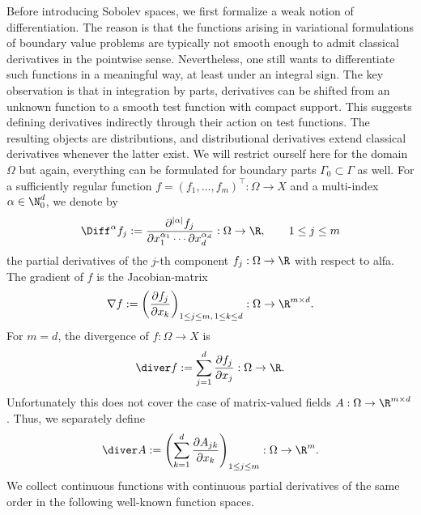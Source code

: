 Before introducing Sobolev spaces, we first formalize a weak notion of differentiation. The reason is that the functions arising in variational formulations of boundary value problems are typically not smooth enough to admit classical derivatives in the pointwise sense. Nevertheless, one still wants to differentiate such functions in a meaningful way, at least under an integral sign. The key observation is that in integration by parts, derivatives can be shifted from an unknown function to a smooth test function with compact support. This suggests defining derivatives indirectly through their action on test functions. The resulting objects are distributions, and distributional derivatives extend classical derivatives whenever the latter exist. We will restrict ourself here for the domain $\Omega$ but again, everything can be formulated for boundary parts $\Gamma_0\subset\Gamma$ as well. For a sufficiently regular function $f=(f_1,\ldots, f_m)^\top:\Omega\to X$ and a multi-index $\alpha\in\N^d_0$, we denote by
\begin{equation*}
	\Diff^\alpha f_j := \frac{\partial^{|\alpha|}f_j}{\partial x_1^{\alpha_1}\cdots\partial x_d^{\alpha_d}}:\Omega\to\R,\qquad 1\le j\le m
\end{equation*}
the partial derivatives of the $j$-th component $f_j:\Omega\to \R$ with respect to alfa. The gradient of $f$ is the Jacobian-matrix
\begin{equation*}
	\nabla f := \left(\frac{\partial f_j}{\partial x_k}\right)_{1\le j\le m,\, 1\le k\le d}:\Omega\to\R^{m\times d}.
\end{equation*}
For $m = d$, the divergence of $f:\Omega\to X$ is
\begin{equation*}
	\diver f:= \sum_{j = 1}^d\frac{\partial f_j}{\partial x_j}:\Omega \to \R.
\end{equation*}
Unfortunately this does not cover the case of matrix-valued fields $A:\Omega\to \R^{m\times d}$. Thus, we separately define
\begin{equation*}
	\diver A := \left(\sum_{k=1}^d \frac{\partial A_{jk}}{\partial x_k}\right)_{1\le j\le m}
	:\Omega\to\R^m.
\end{equation*}
We collect continuous functions with continuous partial derivatives of the same order in the following well-known function spaces.

